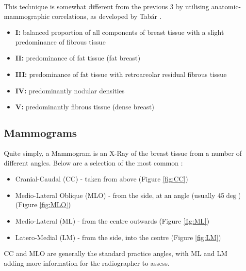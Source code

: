 This technique is somewhat different from the previous 3 by utilising anatomic-mammographic correlations, as developed by Tab\'ar \cite{al}.

\begin{itemize}
  \item \textbf{I: } balanced proportion of all components of breast tissue with a slight predominance of fibrous tissue
  \item \textbf{II: } predominance of fat tissue (fat breast)
  \item \textbf{III: } predominance of fat tissue with retroareolar residual fibrous tissue
  \item \textbf{IV: } predominantly nodular densities
  \item \textbf{V: } predominantly fibrous tissue (dense breast)
\end{itemize}

\subsection{Mammograms}

Quite simply, a Mammogram is an X-Ray of the breast tissue from a number of different angles. Below are a selection of the most common \cite{Radswiki} \cite{Mammography_views_Doc_2016}:
\begin{itemize}
  \item Cranial-Caudal (CC) - taken from above (Figure \ref{fig:CC})
  \item Medio-Lateral Oblique (MLO) - from the side, at an angle (usually 45$\deg$) (Figure \ref{fig:MLO})
  \item Medio-Lateral (ML) - from the centre outwards (Figure \ref{fig:ML})
  \item Latero-Medial (LM) - from the side, into the centre (Figure \ref{fig:LM})
\end{itemize}

CC and MLO are generally the standard practice angles, with ML and LM adding more information for the radiographer to assess.

